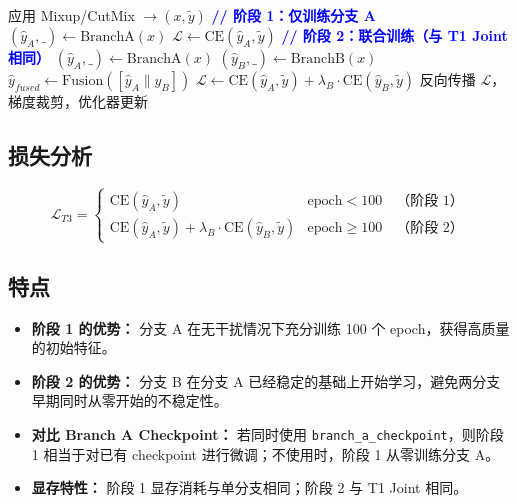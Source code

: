 \documentclass[a4paper,11pt]{article}
\begin{document}
\begin{algorithm}[h]
\caption{T3 Staged 分段训练}
\begin{algorithmic}[1]
        \STATE 应用 Mixup/CutMix $\rightarrow (x, \tilde{y})$
            \STATE \textcolor{blue}{\textbf{// 阶段 1：仅训练分支 A}}
            \STATE $(\hat{y}_A, \_) \leftarrow \text{BranchA}(x)$
            \STATE $\mathcal{L} \leftarrow \text{CE}(\hat{y}_A, \tilde{y})$
        \ELSE
            \STATE \textcolor{blue}{\textbf{// 阶段 2：联合训练（与 T1 Joint 相同）}}
            \STATE $(\hat{y}_A, \_) \leftarrow \text{BranchA}(x)$
            \STATE $(\hat{y}_B, \_) \leftarrow \text{BranchB}(x)$
            \STATE $\hat{y}_{fused} \leftarrow \text{Fusion}([\hat{y}_A \| \hat{y}_B])$
            \STATE $\mathcal{L} \leftarrow \text{CE}(\hat{y}_A, \tilde{y}) + \lambda_B \cdot \text{CE}(\hat{y}_B, \tilde{y})$
        \ENDIF
        \STATE 反向传播 $\mathcal{L}$，梯度裁剪，优化器更新
    \ENDFOR
\ENDFOR
\end{algorithmic}
\end{algorithm}

\subsection{损失分析}

\[
    \mathcal{L}_{T3} = \begin{cases}
        \text{CE}(\hat{y}_A, \tilde{y}) & \text{epoch} < 100 \quad \text{（阶段 1）} \\[6pt]
        \text{CE}(\hat{y}_A, \tilde{y}) + \lambda_B \cdot \text{CE}(\hat{y}_B, \tilde{y}) & \text{epoch} \geq 100 \quad \text{（阶段 2）}
    \end{cases}
\]

\subsection{特点}

\begin{itemize}
    \item \textbf{阶段 1 的优势：} 分支 A 在无干扰情况下充分训练 100 个 epoch，获得高质量的初始特征。
    \item \textbf{阶段 2 的优势：} 分支 B 在分支 A 已经稳定的基础上开始学习，避免两分支早期同时从零开始的不稳定性。
    \item \textbf{对比 Branch A Checkpoint：} 若同时使用 \texttt{branch\_a\_checkpoint}，则阶段 1 相当于对已有 checkpoint 进行微调；不使用时，阶段 1 从零训练分支 A。
    \item \textbf{显存特性：} 阶段 1 显存消耗与单分支相同；阶段 2 与 T1 Joint 相同。
\end{itemize}
\end{document}
